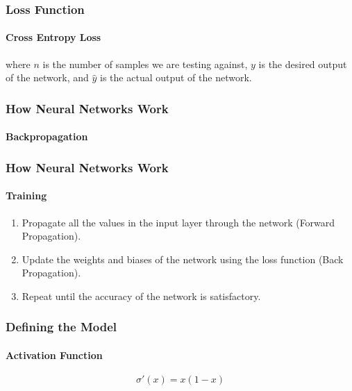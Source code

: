 \documentclass{beamer}
\begin{document}
\begin{frame}
\frametitle{Loss Function}
\framesubtitle{Cross Entropy Loss}
where $n$ is the number of samples we are testing against, $y$ is the desired output of the network, and $\hat{y}$ is the actual output of the network.
\end{frame}

\begin{frame}
\frametitle{How Neural Networks Work}
\framesubtitle{Backpropagation}
\begin{figure}[h!]
    \begin{center}
    \end{center}
\end{figure}
\end{frame}

\begin{frame}
\frametitle{How Neural Networks Work}
\framesubtitle{Training}
\begin{enumerate}
    \item Propagate all the values in the input layer through the network (Forward Propagation).
    \item Update the weights and biases of the network using the loss function (Back Propagation).
    \item Repeat until the accuracy of the network is satisfactory.
\end{enumerate}
\end{frame}

\begin{frame}
\frametitle{Defining the Model}
\framesubtitle{Activation Function}
\begin{equation}
    \sigma'(x) = x(1-x)
    \label{eq:sigmoid-derivative}
\end{equation}
\end{frame}
\end{document}
